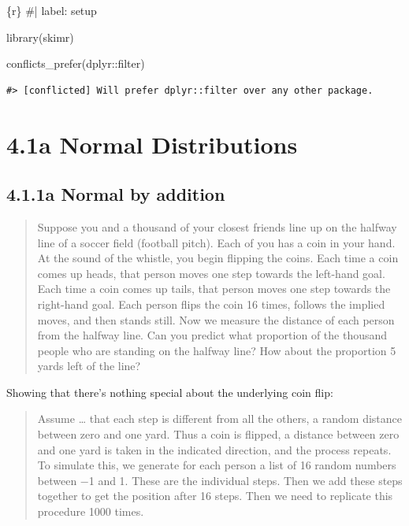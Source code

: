 \documentclass[
  letterpaper,
  DIV=11,
  numbers=noendperiod]{scrreprt}
\newenvironment{Shaded}{\begin{snugshade}}{\end{snugshade}}
\newcommand{\CommentTok}[1]{\textcolor[rgb]{0.37,0.37,0.37}{#1}}
\newcommand{\FunctionTok}[1]{\textcolor[rgb]{0.28,0.35,0.67}{#1}}
\newcommand{\InformationTok}[1]{\textcolor[rgb]{0.37,0.37,0.37}{#1}}
\newcommand{\NormalTok}[1]{\textcolor[rgb]{0.00,0.23,0.31}{#1}}
\newcommand{\SpecialCharTok}[1]{\textcolor[rgb]{0.37,0.37,0.37}{#1}}
\begin{document}
\begin{Shaded}
\begin{Highlighting}[]
\InformationTok{\textasciigrave{}\textasciigrave{}\textasciigrave{}\{r\}}
\CommentTok{\#| label: setup}

\FunctionTok{library}\NormalTok{(skimr)}

\FunctionTok{conflicts\_prefer}\NormalTok{(dplyr}\SpecialCharTok{::}\NormalTok{filter)}
\InformationTok{\textasciigrave{}\textasciigrave{}\textasciigrave{}}
\end{Highlighting}
\end{Shaded}

\begin{verbatim}
#> [conflicted] Will prefer dplyr::filter over any other package.
\end{verbatim}

\hypertarget{a-normal-distributions}{%
\section{4.1a Normal Distributions}\label{a-normal-distributions}}

\hypertarget{a-normal-by-addition}{%
\subsection{4.1.1a Normal by addition}\label{a-normal-by-addition}}

\begin{quote}
Suppose you and a thousand of your closest friends line up on the
halfway line of a soccer field (football pitch). Each of you has a coin
in your hand. At the sound of the whistle, you begin flipping the coins.
Each time a coin comes up heads, that person moves one step towards the
left-hand goal. Each time a coin comes up tails, that person moves one
step towards the right-hand goal. Each person flips the coin 16 times,
follows the implied moves, and then stands still. Now we measure the
distance of each person from the halfway line. Can you predict what
proportion of the thousand people who are standing on the halfway line?
How about the proportion 5 yards left of the line?
\end{quote}

Showing that there's nothing special about the underlying coin flip:

\begin{quote}
Assume \ldots{} that each step is different from all the others, a
random distance between zero and one yard. Thus a coin is flipped, a
distance between zero and one yard is taken in the indicated direction,
and the process repeats. To simulate this, we generate for each person a
list of 16 random numbers between −1 and 1. These are the individual
steps. Then we add these steps together to get the position after 16
steps. Then we need to replicate this procedure 1000 times.
\end{quote}
\end{document}
